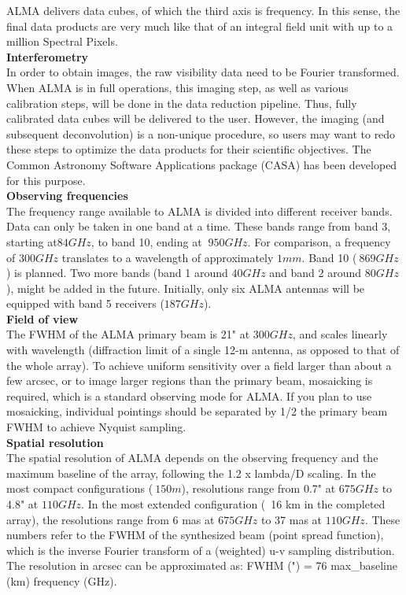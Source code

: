 ALMA delivers data cubes, of which the third axis is frequency. In this sense, the final data products are very much like that of an integral field unit with up to a million Spectral Pixels.\\

\textbf{Interferometry}\\
In order to obtain images, the raw visibility data need to be Fourier transformed. When ALMA is in full operations, this imaging step, as well as various calibration steps, will be done in the data reduction pipeline. Thus, fully calibrated data cubes will be delivered to the user. However, the imaging (and subsequent deconvolution) is a non-unique procedure, so users may want to redo these steps to optimize the data products for their scientific objectives. The Common Astronomy Software Applications package (CASA) has been developed for this purpose.\\

\textbf{Observing frequencies}\\
The frequency range available to ALMA is divided into different receiver bands. Data can only be taken in one band at a time. These bands range from band 3, starting at$ 84 GHz$, to band 10, ending at $~950 GHz$. For comparison, a frequency of $300 GHz$ translates to a wavelength of approximately $1mm$. Band 10 ($~869 GHz$) is planned. Two more bands (band 1 around $40 GHz$ and band 2 around $80 GHz$), might be added in the future. Initially, only six ALMA antennas will be equipped with band 5 receivers ($187 GHz$).\\

\textbf{Field of view}\\
The FWHM of the ALMA primary beam is 21" at $300 GHz$, and scales linearly with wavelength (diffraction limit of a single 12-m antenna, as opposed to that of the whole array). To achieve uniform sensitivity over a field larger than about a few arcsec, or to image larger regions than the primary beam, mosaicking is required, which is a standard observing mode for ALMA. If you plan to use mosaicking, individual pointings should be separated by 1/2 the primary beam FWHM to achieve Nyquist sampling.\\

\textbf{Spatial resolution}\\
The spatial resolution of ALMA depends on the observing frequency and the maximum baseline of the array, following the 1.2 x lambda/D scaling. In the most compact configurations ($~150 m$), resolutions range from 0.7" at $675 GHz$ to 4.8" at $110 GHz$. In the most extended configuration (~16 km in the completed array), the resolutions range from 6 mas at $675 GHz$ to 37 mas at $110 GHz$. These numbers refer to the FWHM of the synthesized beam (point spread function), which is the inverse Fourier transform of a (weighted) u-v sampling distribution. The resolution in arcsec can be approximated as: FWHM (") = 76 \/ max\_baseline (km) \/ frequency (GHz).\\

